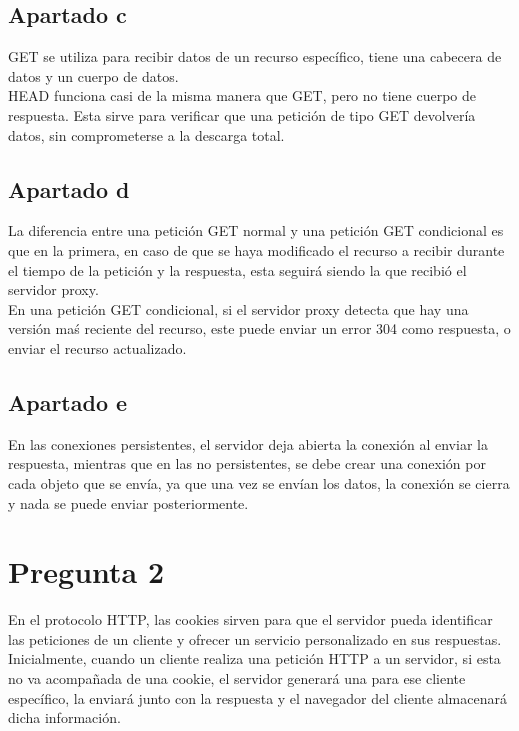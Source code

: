 \documentclass[spanish]{article}
\begin{document}
\subsection{Apartado c}

GET se utiliza para recibir datos de un recurso específico,
tiene una cabecera de datos y un cuerpo de datos.\\

HEAD funciona casi de la misma manera que GET, pero no tiene
cuerpo de respuesta. Esta sirve para verificar que una
petición de tipo GET devolvería datos, sin comprometerse a
la descarga total.

\subsection{Apartado d}

La diferencia entre una petición GET normal y una petición
GET condicional es que en la primera, en caso de que se haya
modificado el recurso a recibir durante el tiempo de la
petición y la respuesta, esta seguirá siendo la que recibió
el servidor proxy.\\

En una petición GET condicional, si el servidor proxy
detecta que hay una versión maś reciente del recurso, este
puede enviar un error 304 como respuesta, o enviar el
recurso actualizado.

\subsection{Apartado e}

En las conexiones persistentes, el servidor deja abierta la
conexión al enviar la respuesta, mientras que en las no
persistentes, se debe crear una conexión por cada objeto que
se envía, ya que una vez se envían los datos, la conexión se
cierra y nada se puede enviar posteriormente.

\section{Pregunta 2}

En el protocolo HTTP, las cookies sirven para que el
servidor pueda identificar las peticiones de un cliente y
ofrecer un servicio personalizado en sus respuestas.\\

Inicialmente, cuando un cliente realiza una petición HTTP a
un servidor, si esta no va acompañada de una cookie, el
servidor generará una para ese cliente específico, la
enviará junto con la respuesta y el navegador del cliente
almacenará dicha información.\\
\end{document}
